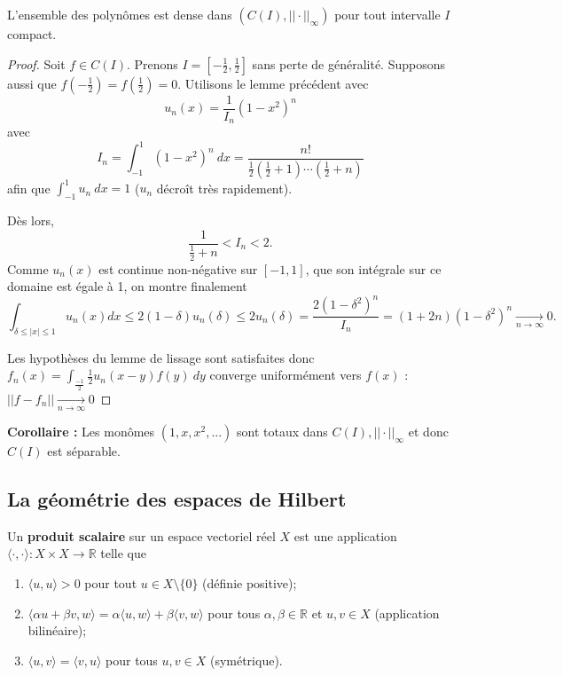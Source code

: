 \begin{theo}[Weierstrass]
    L'ensemble des polynômes est dense dans $\left(C(I), ||\cdot||_\infty\right)$ pour tout intervalle $I$ compact.
\end{theo}
\begin{proof}
    Soit $f\in C(I)$. Prenons $I=\left[ -\frac{1}{2},\frac{1}{2} \right]$ sans perte de généralité. Supposons aussi que $f\left(-\frac{1}{2}\right) = f\left(\frac{1}{2}\right)=0$. Utilisons le lemme précédent avec
    \begin{equation*}
        u_n(x) = \frac{1}{I_n} (1-x^2)^n
    \end{equation*}
    avec 
    \begin{equation*}
        I_n = \int_{-1}^1 (1-x^2)^n\ dx = \frac{n!}{\frac{1}{2}\left(\frac{1}{2}+1\right)\cdots\left(\frac{1}{2}+n\right)}
    \end{equation*}
    afin que $\int_{-1}^1 u_n \ dx = 1$ ($u_n$ décroît très rapidement).
    
    Dès lors,
    \begin{equation*}
        \frac{1}{\frac{1}{2}+n} < I_n < 2.
    \end{equation*}
    Comme $u_n(x)$ est continue non-négative sur $[-1,1]$, que son intégrale sur ce domaine est égale à 1, on montre finalement
    \begin{equation*}
        \int_{\delta\leq|x|\leq1}u_n(x)dx \leq 2(1-\delta)u_n(\delta) \leq 2u_n(\delta) = \frac{2(1-\delta^2)^n}{I_n} = (1+2n)(1-\delta^2)^n \underset{n\to\infty}{\longrightarrow} 0.
    \end{equation*}
    
    Les hypothèses du lemme de lissage sont satisfaites donc $f_n(x) = \int_{\frac{-1}{2}}{\frac{1}{2}} u_n(x-y)f(y)\ dy$ converge uniformément vers $f(x)$ : $||f-f_n|| \underset{n\to\infty}{\longrightarrow} 0$
\end{proof}

\textbf{Corollaire :} Les monômes $(1,x,x^2,...)$ sont totaux dans $C(I),||\cdot||_\infty$ et donc $C(I)$ est séparable.

\subsection{La géométrie des espaces de Hilbert}

\begin{definition}
    Un \textbf{produit scalaire} sur un espace vectoriel réel $X$ est une application $\langle\cdot,\cdot\rangle:X\times X\rightarrow\mathbb{R}$ telle que
    \begin{enumerate}
        \item $\langle u,u \rangle>0$ pour tout $u\in X\setminus\{0\}$ (définie positive);
        \item $\langle \alpha u + \beta v,w \rangle = \alpha\langle u,w \rangle + \beta\langle v,w \rangle$ pour tous $\alpha,\beta\in\mathbb{R}$ et $u,v\in X$ (application bilinéaire);
        \item $\langle u,v \rangle = \langle v,u \rangle$ pour tous $u,v\in X$ (symétrique).
    \end{enumerate}
\end{definition}

